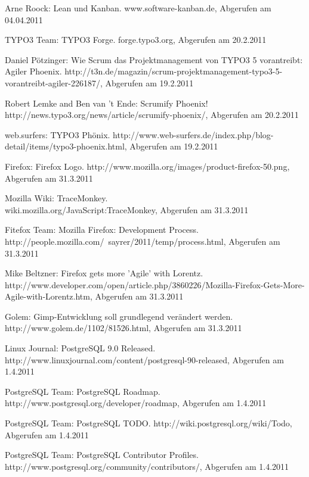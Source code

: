 \documentclass[german,english]{header}
\begin{document}
\begin{thebibliography}{5}
Arne Roock: 
Lean und Kanban.
www.software-kanban.de, Abgerufen am 04.04.2011

TYPO3 Team:
TYPO3 Forge.
forge.typo3.org, Abgerufen am 20.2.2011

Daniel Pötzinger:
Wie Scrum das Projektmanagement von TYPO3 5 vorantreibt: Agiler Phoenix.
http://t3n.de/magazin/scrum-projektmanagement-typo3-5-vorantreibt-agiler-226187/, Abgerufen am 19.2.2011

Robert Lemke and Ben van 't Ende:
Scrumify Phoenix!\\
http://news.typo3.org/news/article/scrumify-phoenix/, Abgerufen am 20.2.2011

web.surfers:
TYPO3 Phönix.
http://www.web-surfers.de/index.php/blog-detail/items/typo3-phoenix.html, Abgerufen am 19.2.2011

Firefox:
Firefox Logo.
http://www.mozilla.org/images/product-firefox-50.png, Abgerufen am 31.3.2011

Mozilla Wiki:
TraceMonkey.
\\wiki.mozilla.org/JavaScript:TraceMonkey, Abgerufen am 31.3.2011

Fitefox Team:
Mozilla Firefox: Development Process.\\
http://people.mozilla.com/~sayrer/2011/temp/process.html, Abgerufen am 31.3.2011

Mike Beltzner:
Firefox gets more 'Agile' with Lorentz.
\\http://www.developer.com/open/article.php/3860226/Mozilla-Firefox-Gets-More-Agile-with-Lorentz.htm, Abgerufen am 31.3.2011

Golem: Gimp-Entwicklung soll grundlegend verändert werden.\\
http://www.golem.de/1102/81526.html, Abgerufen am 31.3.2011

Linux Journal:
PostgreSQL 9.0 Released.
http://www.linuxjournal.com/content/postgresql-90-released, Abgerufen am 1.4.2011

PostgreSQL Team:
PostgreSQL Roadmap.
http://www.postgresql.org/developer/roadmap, Abgerufen am 1.4.2011

PostgreSQL Team:
PostgreSQL TODO.
http://wiki.postgresql.org/wiki/Todo, Abgerufen am 1.4.2011

PostgreSQL Team:
PostgreSQL Contributor Profiles.\\
http://www.postgresql.org/community/contributors/, Abgerufen am 1.4.2011


\end{thebibliography}
\end{document}
